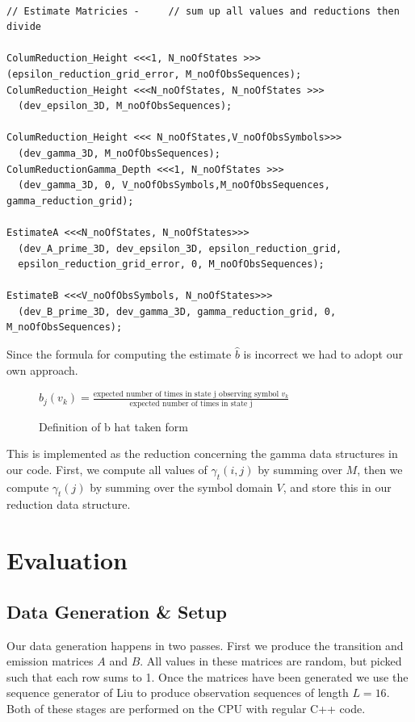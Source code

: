 \documentclass[english, paper=a4]{scrartcl}
\begin{document}
\begin{verbatim}
	
// Estimate Matricies - 	// sum up all values and reductions then divide

ColumReduction_Height <<<1, N_noOfStates >>>
(epsilon_reduction_grid_error, M_noOfObsSequences);
ColumReduction_Height <<<N_noOfStates, N_noOfStates >>>
  (dev_epsilon_3D, M_noOfObsSequences);

ColumReduction_Height <<< N_noOfStates,V_noOfObsSymbols>>>
  (dev_gamma_3D, M_noOfObsSequences);
ColumReductionGamma_Depth <<<1, N_noOfStates >>>
  (dev_gamma_3D, 0, V_noOfObsSymbols,M_noOfObsSequences, gamma_reduction_grid);

EstimateA <<<N_noOfStates, N_noOfStates>>>
  (dev_A_prime_3D, dev_epsilon_3D, epsilon_reduction_grid, 
  epsilon_reduction_grid_error, 0, M_noOfObsSequences);

EstimateB <<<V_noOfObsSymbols, N_noOfStates>>>
  (dev_B_prime_3D, dev_gamma_3D, gamma_reduction_grid, 0, M_noOfObsSequences);
\end{verbatim}

Since the formula for computing the estimate \(\hat{b}\) is incorrect we had to adopt our own approach.

\begin{figure}

\centering

\( \hat{b}_j(v_k) = \frac{\text{expected number of times in state j observing symbol } v_k}{\text{expected number of times in state j}} \)
\caption{Definition of b hat taken form \cite{hmm}}

\end{figure}

This is implemented as the reduction concerning the gamma data structures in our code. First, we compute all values of \(\gamma_t(i,j)\) by summing over \(M\), then we compute \(\gamma_t(j)\) by summing over the symbol domain \(V\), and store this in our reduction data structure.

\section{Evaluation}

\subsection{Data Generation \& Setup}

Our data generation happens in two passes. First we produce the transition and emission matrices $A$ and $B$. All values in these matrices are random, but picked such that each row sums to 1. Once the matrices have been generated we use the sequence generator of Liu \cite{hmm} to produce observation sequences of length $L = 16$. Both of these stages are performed on the CPU with regular C++ code.
\end{document}
